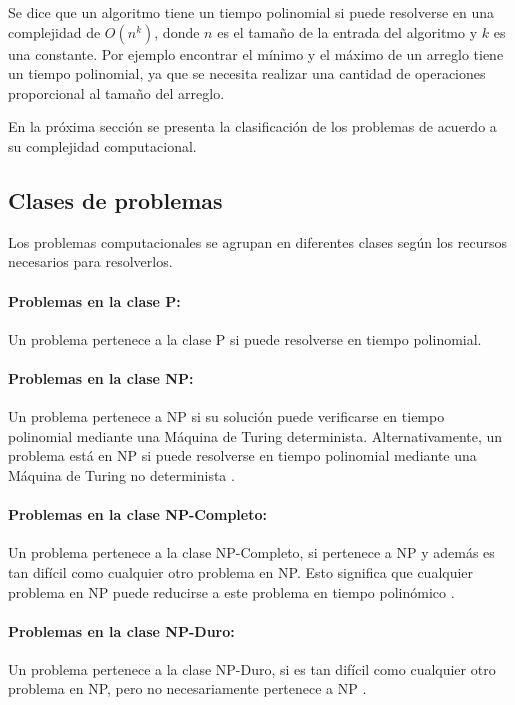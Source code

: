 Se dice que un algoritmo tiene un tiempo polinomial si puede resolverse en una complejidad de $O(n^k)$, donde $n$ es el tamaño de la entrada del algoritmo y $k$
es una constante. Por ejemplo encontrar el mínimo y el máximo de un arreglo tiene un tiempo polinomial, ya que se necesita realizar una cantidad de operaciones
proporcional al tamaño del arreglo.


En la próxima sección se presenta la clasificación de los problemas de acuerdo a su complejidad computacional.
\subsection{Clases de problemas}

Los problemas computacionales \cite{authomataTheory} se agrupan en diferentes clases según los recursos necesarios para resolverlos.

\paragraph{Problemas en la clase P:}
Un problema pertenece a la clase P si puede resolverse en tiempo polinomial.

\paragraph{Problemas en la clase NP:}
Un problema pertenece a NP si su solución puede verificarse en tiempo polinomial mediante una Máquina de Turing determinista. Alternativamente, un problema está en NP si puede resolverse en tiempo polinomial mediante una Máquina de Turing no determinista \cite{authomataTheory}.

\paragraph{Problemas en la clase NP-Completo:}
Un problema pertenece a la clase NP-Completo, si pertenece a NP y además es tan difícil como cualquier otro problema en NP. Esto significa que cualquier problema en NP puede reducirse a este problema en tiempo polinómico \cite{authomataTheory}.

\paragraph{Problemas en la clase NP-Duro:}
Un problema pertenece a la clase NP-Duro, si es tan difícil como cualquier otro problema en NP, pero no
necesariamente pertenece a NP \cite{authomataTheory}.

